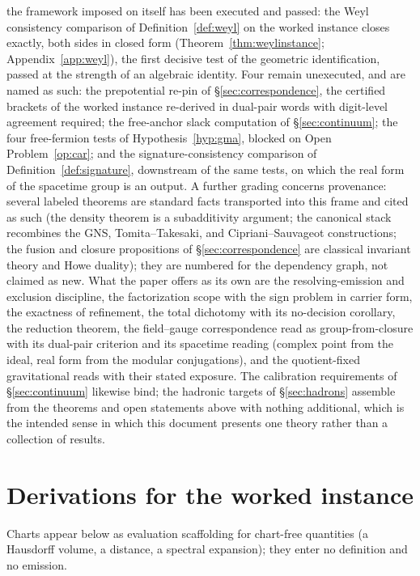 \documentclass[11pt]{article}
\theoremstyle{definition}
\theoremstyle{remark}
\begin{document}
the framework imposed on itself has been executed and passed: the Weyl
consistency comparison of Definition~\ref{def:weyl} on the worked
instance closes exactly, both sides in closed form
(Theorem~\ref{thm:weylinstance}; Appendix~\ref{app:weyl}), the first
decisive test of the geometric identification, passed at the strength
of an algebraic identity.  Four remain
unexecuted, and are
named as such: the prepotential re-pin of \S\ref{sec:correspondence},
the certified brackets of the worked instance re-derived in dual-pair
words with digit-level agreement required; the
free-anchor slack computation of \S\ref{sec:continuum}; the four
free-fermion tests of Hypothesis~\ref{hyp:gma}, blocked on Open
Problem~\ref{op:car}; and the signature-consistency comparison of
Definition~\ref{def:signature}, downstream of the same tests, on which
the real form of the spacetime group is an output.  A further grading concerns provenance: several
labeled theorems are standard facts transported into this frame and
cited as such (the density theorem is a subadditivity argument; the
canonical stack recombines the GNS, Tomita--Takesaki, and
Cipriani--Sauvageot constructions; the fusion and closure propositions
of \S\ref{sec:correspondence} are classical invariant theory and Howe
duality); they are numbered for the
dependency graph, not claimed as new.  What the paper offers as its own
are the resolving-emission and exclusion discipline, the factorization
scope with the sign problem in carrier form, the exactness of
refinement, the total dichotomy with its no-decision corollary, the
reduction theorem, the field--gauge correspondence read as
group-from-closure with its dual-pair criterion and its spacetime
reading (complex point from the ideal, real form from the modular
conjugations), and the quotient-fixed
gravitational reads with
their stated exposure.  The calibration requirements of
\S\ref{sec:continuum} likewise bind; the hadronic targets of
\S\ref{sec:hadrons} assemble from the theorems and open statements
above with nothing additional, which is the intended sense in which
this document presents one theory rather than a collection of
results.

\appendix

\section{Derivations for the worked instance}\label{app:derivations}
Charts appear below as evaluation scaffolding for chart-free quantities
(a Hausdorff volume, a distance, a spectral expansion); they enter no
definition and no emission.
\end{document}
